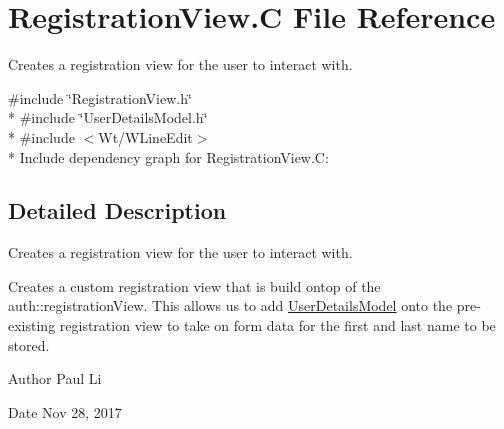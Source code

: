 \hypertarget{RegistrationView_8C}{}\section{Registration\+View.\+C File Reference}
\label{RegistrationView_8C}


Creates a registration view for the user to interact with.  


{\ttfamily \#include \char`\"{}Registration\+View.\+h\char`\"{}}\\*
{\ttfamily \#include \char`\"{}User\+Details\+Model.\+h\char`\"{}}\\*
{\ttfamily \#include $<$Wt/\+W\+Line\+Edit$>$}\\*
Include dependency graph for Registration\+View.\+C\+:


\subsection{Detailed Description}
Creates a registration view for the user to interact with. 

Creates a custom registration view that is build ontop of the auth\+::registration\+View. This allows us to add \hyperlink{classUserDetailsModel}{User\+Details\+Model} onto the pre-\/existing registration view to take on form data for the first and last name to be stored.

\begin{DoxyAuthor}{Author}
Paul Li 
\end{DoxyAuthor}
\begin{DoxyDate}{Date}
Nov 28, 2017 
\end{DoxyDate}
